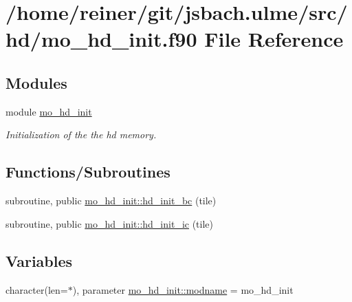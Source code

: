 \hypertarget{mo__hd__init_8f90}{}\section{/home/reiner/git/jsbach.ulme/src/hd/mo\+\_\+hd\+\_\+init.f90 File Reference}
\label{mo__hd__init_8f90}
\subsection*{Modules}
\begin{DoxyCompactItemize}
\item 
module \hyperlink{namespacemo__hd__init}{mo\+\_\+hd\+\_\+init}
\begin{DoxyCompactList}\small\item\em Initialization of the the hd memory. \end{DoxyCompactList}\end{DoxyCompactItemize}
\subsection*{Functions/\+Subroutines}
\begin{DoxyCompactItemize}
\item 
subroutine, public \hyperlink{namespacemo__hd__init_adf1d82e3e44ab86867243ede5e9d8a4c}{mo\+\_\+hd\+\_\+init\+::hd\+\_\+init\+\_\+bc} (tile)
\item 
subroutine, public \hyperlink{namespacemo__hd__init_a526043119739677fd2421c98d327096c}{mo\+\_\+hd\+\_\+init\+::hd\+\_\+init\+\_\+ic} (tile)
\end{DoxyCompactItemize}
\subsection*{Variables}
\begin{DoxyCompactItemize}
\item 
character(len=$\ast$), parameter \hyperlink{namespacemo__hd__init_a18c0a770451ae8f48a6785b1c570cf45}{mo\+\_\+hd\+\_\+init\+::modname} = \textquotesingle{}mo\+\_\+hd\+\_\+init\textquotesingle{}
\end{DoxyCompactItemize}
